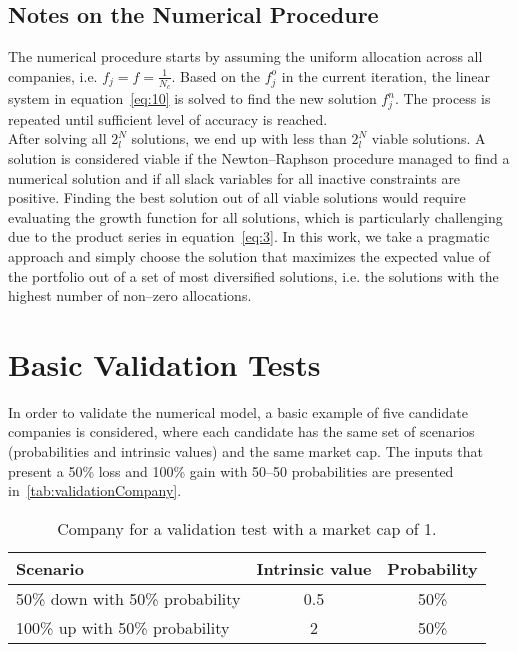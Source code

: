 \documentclass{article}
\begin{document}
\subsection{Notes on the Numerical Procedure}
\label{sec:numericalNotes}

\noindent The numerical procedure starts by assuming the uniform allocation
across all companies, i.e. $f_j = f = \frac{1}{N_c}$. Based on the $f_j^o$ in
the current iteration, the linear system in equation~\eqref{eq:10} is solved to
find the new solution $f_j^n$. The process is repeated until sufficient level of
accuracy is reached.\\

\indent After solving all $2^N_l$ solutions, we end up with less than $2^N_l$
viable solutions. A solution is considered viable if the Newton--Raphson
procedure managed to find a numerical solution and if all slack variables
for all inactive constraints are positive. Finding the best solution out of all
viable solutions would require evaluating the growth function for all
solutions, which is particularly challenging due to the product series
in equation~\eqref{eq:3}. In this work, we take a pragmatic approach and
simply choose the solution that maximizes the expected value of the portfolio
out of a set of most diversified solutions, i.e. the solutions with the highest
number of non--zero allocations.

\section{Basic Validation Tests}
\label{sec:validation}

\noindent In order to validate the numerical model, a basic example of five
candidate companies is considered, where each candidate has the same set of
scenarios (probabilities and intrinsic values) and the same market cap.
The inputs that present a 50\% loss and 100\% gain with 50--50 probabilities are
presented in~\autoref{tab:validationCompany}.\\

\begin{table}[!ht]
\caption{Company for a validation test with a market cap of 1.}
\vspace{0.25cm}
\centering
\begin{tabular}{l|c|c}
Scenario & Intrinsic value & Probability \\
\hline
50\% down with 50\% probability & 0.5 & 50\% \\
100\% up with 50\% probability & 2 & 50\% \\
\end{tabular}%
\label{tab:validationCompany}%
\end{table}%
\end{document}
